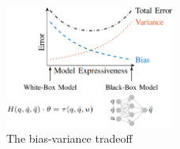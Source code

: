 \begin{figure}
    \centering
    \includegraphics[width=0.5\textwidth]{slike/Fig02_10.png}
    \caption[The bias-variance tradeoff]{The bias-variance tradeoff \cite{Gupta2019}}
    \label{fig:StructuredLearning}
\end{figure}

\newpage